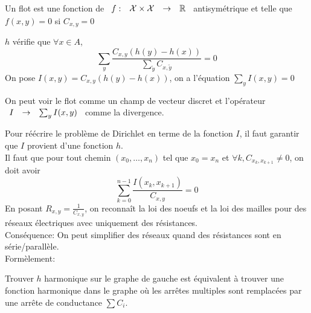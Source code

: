 \documentclass[]{report}
\begin{document}
    \begin{df}{}{}
        Un flot est une fonction de $\begin{array}{ccccc} f : & \mathcal{X}\times\mathcal{X} & \to & \mathbb{R} \end{array}$ antisymétrique et telle que $f(x,y)=0$ si $C_{x,y}=0$
    \end{df}

    $h$ vérifie que $\forall x\in A$,
    \[\sum_y\frac{C_{x,y}(h(y)-h(x))}{\sum_{\tilde{y}}C_{x,\tilde{y}}}=0\]
    On pose $I(x,y)=C_{x,y}(h(y)-h(x))$, on a l'équation $\sum_y I(x,y)=0$
    
    \begin{re}{}{}
        On peut voir le flot comme un champ de vecteur discret et l'opérateur $\begin{array}{ccccc} I & \to & \sum_y I(x,y) \end{array}$ comme la divergence.
    \end{re}

    Pour réécrire le problème de Dirichlet en terme de la fonction $I$, il faut garantir que $I$ provient d'une fonction $h$.\\
    Il faut que pour tout chemin $(x_0,\ldots,x_n)$ tel que $x_0=x_n$ et $\forall k,C_{x_k,x_{k+1}}\neq 0$, on doit avoir
    \[\sum_{k=0}^{n-1}\frac{I(x_k,x_{k+1})}{C_{x,y}}=0\]
    En posant $R_{x,y}=\frac{1}{C_{x,y}}$, on reconnaît la loi des noeufs et la loi des mailles pour des réseaux électriques avec uniquement des résistances.\\
    Conséquence: On peut simplifier des réseaux quand des résistances sont en série/parallèle.\\
    Formèlement:
    \begin{center} \end{center}
    Trouver $h$ harmonique sur le graphe  de gauche est équivalent à trouver une fonction harmonique dans le graphe où les arrêtes multiples sont remplacées par une arrête de conductance $\sum C_i$.\\
\end{document}
